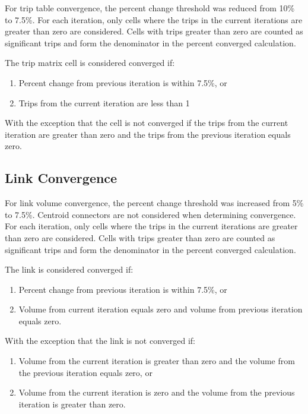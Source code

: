 \documentclass[
  letterpaper,
  DIV=11,
  numbers=noendperiod]{scrreprt}
\providecommand{\tightlist}{%
  \setlength{\itemsep}{0pt}\setlength{\parskip}{0pt}}\usepackage{longtable,booktabs,array}
\begin{document}
For trip table convergence, the percent change threshold was reduced
from 10\% to 7.5\%. For each iteration, only cells where the trips in
the current iterations are greater than zero are considered. Cells with
trips greater than zero are counted as significant trips and form the
denominator in the percent converged calculation.

The trip matrix cell is considered converged if:

\begin{enumerate}
\def\labelenumi{\arabic{enumi}.}
\tightlist
\item
  Percent change from previous iteration is within 7.5\%, or
\item
  Trips from the current iteration are less than 1
\end{enumerate}

With the exception that the cell is not converged if the trips from the
current iteration are greater than zero and the trips from the previous
iteration equals zero.

\hypertarget{link-convergence}{%
\subsection{Link Convergence}\label{link-convergence}}

For link volume convergence, the percent change threshold was increased
from 5\% to 7.5\%. Centroid connectors are not considered when
determining convergence. For each iteration, only cells where the trips
in the current iterations are greater than zero are considered. Cells
with trips greater than zero are counted as significant trips and form
the denominator in the percent converged calculation.

The link is considered converged if:

\begin{enumerate}
\def\labelenumi{\arabic{enumi}.}
\tightlist
\item
  Percent change from previous iteration is within 7.5\%, or
\item
  Volume from current iteration equals zero and volume from previous
  iteration equals zero.
\end{enumerate}

With the exception that the link is not converged if:

\begin{enumerate}
\def\labelenumi{\arabic{enumi}.}
\tightlist
\item
  Volume from the current iteration is greater than zero and the volume
  from the previous iteration equals zero, or
\item
  Volume from the current iteration is zero and the volume from the
  previous iteration is greater than zero.
\end{enumerate}
\end{document}
